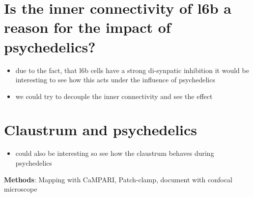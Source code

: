 \documentclass[12pt, a4paper, openany]{article}
\begin{document}
\section{Is the inner connectivity of l6b a reason for the impact of psychedelics?}
\begin{itemize}
\setlength\itemsep{0em}
\item due to the fact, that l6b cells have a strong di-synpatic inhibition it would be interesting to see how this acts under the influence of psychedelics
\item we could try to decouple the inner connectivity and see the effect
\end {itemize}

\section{Claustrum and psychedelics}
\begin{itemize}
\setlength\itemsep{0em}
\item could also be interesting so see how the claustrum behaves during psychedelics 
\end{itemize}
\textbf{Methods}: Mapping with CaMPARI, Patch-clamp, document with confocal microscope
\end{document}
